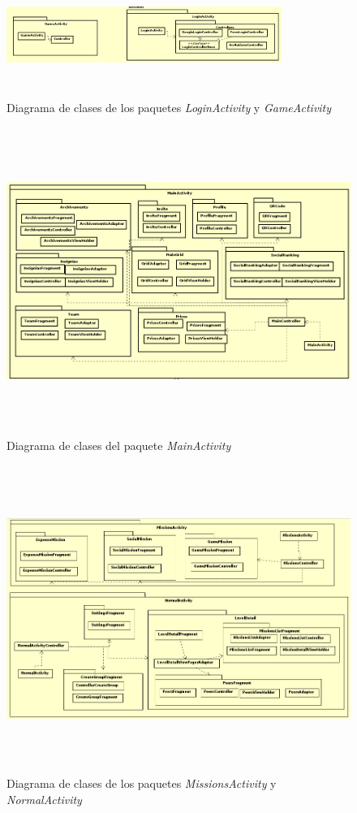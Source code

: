 \documentclass[twoside]{report}
\begin{document}
\begin{figure}[H]
\centering
\includegraphics[height=4cm,width=0.8\textwidth]{images/structureloginGameModel.PNG}
\caption{Diagrama de clases de los paquetes \textit{LoginActivity} y \textit{GameActivity}}
\end{figure}

\begin{figure}[H]
\centering
\includegraphics[height=10cm,width=\textwidth]{images/structureMainActivity.PNG}
\caption{Diagrama de clases del paquete \textit{MainActivity}}
\end{figure}

\begin{figure}[H]
\centering
\includegraphics[height=10cm,width=\textwidth]{images/structureMissions.PNG}
\caption{Diagrama de clases de los paquetes \textit{MissionsActivity} y \textit{NormalActivity}}
\end{figure}
\end{document}
